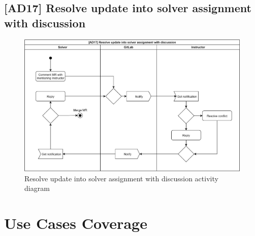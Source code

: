 \subsection{{[}AD17{]} Resolve update into solver assignment with discussion} \label{ssec:ad17}

\begin{figure}[H]
    \centering
    \includegraphics[width=\textwidth,height=\textheight,keepaspectratio]{Figures/ad/ad3.png}
    \caption{Resolve update into solver assignment with discussion activity diagram}
\end{figure}

\section{Use Cases Coverage} \label{sec:ucadc}

